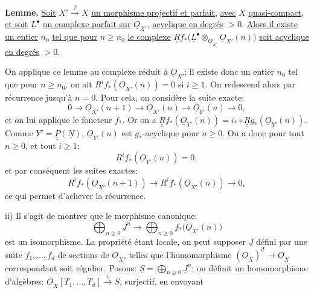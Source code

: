 
\textbf{Lemme.} \uline{Soit} \(X'\xrightarrow{f}X\) \uline{un morphisme projectif et parfait}, \uline{avec} \(X\) \uline{quasi-compact}, \uline{et soit} \(\underline{L}^\bullet\) \uline{un complexe parfait sur} \(\underline{O}_{X'}\), \uline{acyclique en degrés} \(>0\). \uline{Alors il existe un entier} \(n_0\) \uline{tel que pour} \(n\ge n_0\) \uline{le complexe} \(\underline{\underline{R}}f_*\bigl(\underline{L}^\bullet\otimes_{\underline{O}_{X'}}\underline{O}_{X'}(n)\bigr)\) \uline{soit acyclique en degrés} \(>0\).

On applique ce lemme au complexe réduit à \(\underline{O}_{X'}\); il existe donc un entier \(n_0\) tel que pour \(n\ge n_0\), on ait \(R^if_*(\underline{O}_{X'}(n))=0\) si \(i\ge1\). On redescend alors par récurrence jusqu'à \(n=0\). Pour cela, on considère la suite exacte:
\[
0\longrightarrow
\underline{O}_{X'}(n+1)
\longrightarrow
\underline{O}_{X'}(n)
\longrightarrow
\underline{O}_{Y'}(n)
\longrightarrow0,
\]
et on lui applique le foncteur \(f_*\). Or on a \(\underline{\underline{R}}f_*(\underline{O}_{Y'}(n))=i_*\circ\underline{\underline{R}}g_*(\underline{O}_{Y'}(n))\). Comme \(Y'=\underline{\underline{P}}(\underline{N})\), \(\underline{O}_{Y'}(n)\) est \(g_*\)-acyclique pour \(n\ge0\). On a donc pour tout \(n\ge0\), et tout \(i\ge1\):
\[
R^if_*(\underline{O}_{Y'}(n))=0,
\]
et par conséquent les suites exactes:
\[
R^if_*(\underline{O}_{X'}(n+1))
\longrightarrow
R^if_*(\underline{O}_{X'}(n))
\longrightarrow0,
\]
ce qui permet d'achever la récurrence.

ii) Il s'agit de montrer que le morphisme canonique:
\[
\bigoplus_{n\ge0}\underline{J}^n
\longrightarrow
\bigoplus_{n\ge0}f_*\bigl(\underline{O}_{X'}(n)\bigr)
\]
est un isomorphisme. La propriété étant locale, on peut supposer \(\underline{J}\) défini par une suite \(f_1,\ldots,f_d\) de sections de \(\underline{O}_X\), telles que l'homomorphisme \((\underline{O}_X)^d\longrightarrow\underline{O}_X\) correspondant soit régulier. Posons: \(\underline{S}=\bigoplus_{n\ge0}\underline{J}^n\); on définit un homomorphisme d'algèbres: \(\underline{O}_X[T_1,\ldots,T_d]\xrightarrow{v}\underline{S}\), surjectif, en envoyant 
